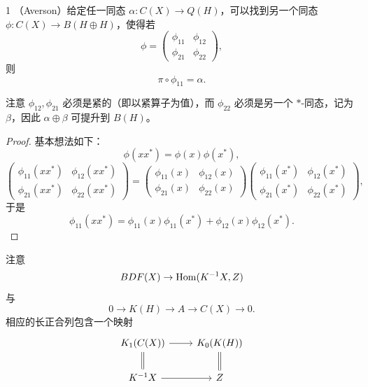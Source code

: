 \begin{thm}{1}
（Averson）给定任一同态 $\alpha : C(X) \to Q(H)$，可以找到另一个同态 $\phi : C(X) \to B(H \oplus H)$，使得若
\[
  \phi = \begin{pmatrix} \phi_{11} & \phi_{12} \\ \phi_{21} & \phi_{22} \end{pmatrix},
\]
则
\[
  \pi \circ \phi_{11} = \alpha.
\]

注意 $\phi_{12}, \phi_{21}$ 必须是紧的（即以紧算子为值），而 $\phi_{22}$ 必须是另一个 $*$-同态，记为 $\beta$，因此 $\alpha \oplus \beta$ 可提升到 $B(H)$。
\end{thm}


\begin{proof}
基本想法如下：
\[
  \phi(xx^*) = \phi(x)\phi(x^*),
\]
\[
  \begin{pmatrix} \phi_{11}(xx^*) & \phi_{12}(xx^*) \\ \phi_{21}(xx^*) & \phi_{22}(xx^*) \end{pmatrix}
  =
  \begin{pmatrix} \phi_{11}(x) & \phi_{12}(x) \\ \phi_{21}(x) & \phi_{22}(x) \end{pmatrix}
  \begin{pmatrix} \phi_{11}(x^*) & \phi_{12}(x^*) \\ \phi_{21}(x^*) & \phi_{22}(x^*) \end{pmatrix},
\]
于是
\[
  \phi_{11}(xx^*) = \phi_{11}(x)\phi_{11}(x^*) + \phi_{12}(x)\phi_{12}(x^*).
\]
\end{proof}

注意
\[
  BDF(X) \to \operatorname{Hom}(K^{-1}X, Z)
\]
与
\[
  0 \to K(H) \to A \to C(X) \to 0.
\]
相应的长正合列包含一个映射
\[
  \begin{tikzcd}
    K_1(C(X)) \arrow[r] \arrow[d,equal] & K_0(K(H)) \arrow[d,equal] \\
    K^{-1}X \arrow[r] & \Z
  \end{tikzcd}
\]

